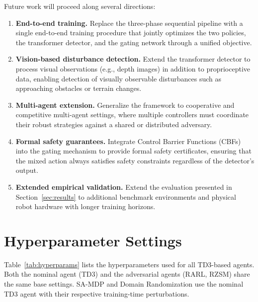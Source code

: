 \documentclass[conference]{IEEEtran}
\begin{document}
Future work will proceed along several directions:
\begin{enumerate}
\item \textbf{End-to-end training.}  Replace the three-phase sequential
  pipeline with a single end-to-end training procedure that jointly
  optimizes the two policies, the transformer detector, and the gating
  network through a unified objective.
\item \textbf{Vision-based disturbance detection.}  Extend the transformer
  detector to process visual observations (e.g., depth images) in addition
  to proprioceptive data, enabling detection of visually observable
  disturbances such as approaching obstacles or terrain changes.
\item \textbf{Multi-agent extension.}  Generalize the framework to
  cooperative and competitive multi-agent settings, where multiple
  controllers must coordinate their robust strategies against a shared
  or distributed adversary.
\item \textbf{Formal safety guarantees.}  Integrate Control Barrier
  Functions (CBFs) into the gating mechanism to provide formal safety
  certificates, ensuring that the mixed action always satisfies safety
  constraints regardless of the detector's output.
\item \textbf{Extended empirical validation.}  Extend the evaluation
  presented in Section~\ref{sec:results} to additional benchmark
  environments and physical robot hardware with longer training horizons.
\end{enumerate}

\appendix
\section{Hyperparameter Settings}\label{app:hyperparams}

Table~\ref{tab:hyperparams} lists the hyperparameters used for all TD3-based
agents. Both the nominal agent (TD3) and the adversarial agents (RARL, RZSM)
share the same base settings.  SA-MDP and Domain Randomization use the
nominal TD3 agent with their respective training-time perturbations.
\end{document}
